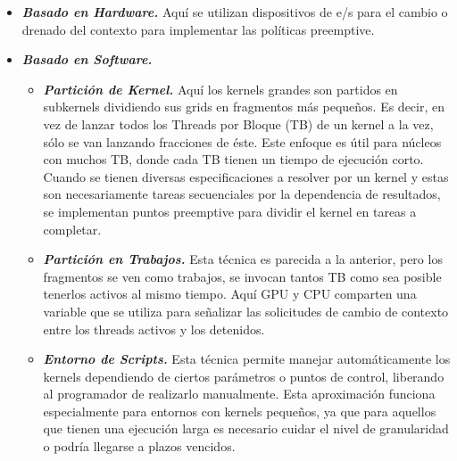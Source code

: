 \begin{itemize}
\item \textbf{\textit{Basado en Hardware.}} 
	Aquí se utilizan dispositivos de e/s para el cambio o drenado del contexto para implementar las políticas preemptive. 	

\item \textbf{\textit{Basado en Software.}}
	\begin{itemize}
	\item \textbf{\textit{Partición de Kernel.}}
		Aquí los kernels grandes son partidos en subkernels dividiendo sus grids en fragmentos más pequeños. Es decir, en vez de lanzar todos los Threads por Bloque (TB) de un kernel a la vez, sólo se van lanzando fracciones de éste. Este enfoque es útil para núcleos con muchos TB, donde cada TB tienen un tiempo de ejecución corto. Cuando se tienen diversas especificaciones a resolver por un kernel y estas son necesariamente tareas secuenciales por la dependencia de resultados, se implementan puntos preemptive para dividir el kernel en tareas a completar.  
	
	\item \textbf{\textit{Partición en Trabajos.}}
		Esta técnica es parecida a la anterior, pero los fragmentos se ven como trabajos, se invocan tantos TB como sea posible tenerlos activos al mismo tiempo. Aquí GPU y CPU comparten una variable que se utiliza para señalizar las solicitudes de cambio de contexto entre los threads activos y los detenidos.

	\item \textbf{\textit{Entorno de Scripts.}}	
		Esta técnica permite manejar automáticamente los kernels dependiendo de ciertos parámetros o puntos de control, liberando al programador de realizarlo manualmente. Esta aproximación funciona especialmente para entornos con kernels pequeños, ya que para aquellos que tienen una ejecución larga es necesario cuidar el nivel de granularidad o podría llegarse a plazos vencidos.
		
	\end{itemize}


\end{itemize}
